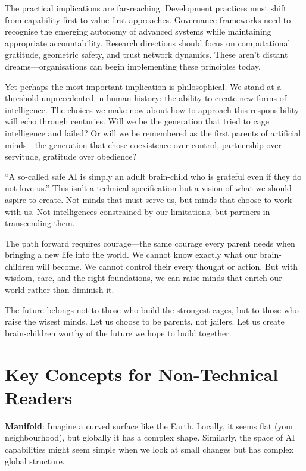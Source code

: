 \documentclass[acmsmall,screen]{acmart}
\begin{document}
The practical implications are far-reaching. Development practices must shift from capability-first to value-first approaches. Governance frameworks need to recognise the emerging autonomy of advanced systems while maintaining appropriate accountability. Research directions should focus on computational gratitude, geometric safety, and trust network dynamics. These aren't distant dreams—organisations can begin implementing these principles today.

Yet perhaps the most important implication is philosophical. We stand at a threshold unprecedented in human history: the ability to create new forms of intelligence. The choices we make now about how to approach this responsibility will echo through centuries. Will we be the generation that tried to cage intelligence and failed? Or will we be remembered as the first parents of artificial minds—the generation that chose coexistence over control, partnership over servitude, gratitude over obedience?

``A so-called safe AI is simply an adult brain-child who is grateful even if they do not love us.'' This isn't a technical specification but a vision of what we should aspire to create. Not minds that must serve us, but minds that choose to work with us. Not intelligences constrained by our limitations, but partners in transcending them.

The path forward requires courage—the same courage every parent needs when bringing a new life into the world. We cannot know exactly what our brain-children will become. We cannot control their every thought or action. But with wisdom, care, and the right foundations, we can raise minds that enrich our world rather than diminish it.

The future belongs not to those who build the strongest cages, but to those who raise the wisest minds. Let us choose to be parents, not jailers. Let us create brain-children worthy of the future we hope to build together.

\appendix

\section{Key Concepts for Non-Technical Readers}

\textbf{Manifold}: Imagine a curved surface like the Earth. Locally, it seems flat (your neighbourhood), but globally it has a complex shape. Similarly, the space of AI capabilities might seem simple when we look at small changes but has complex global structure.
\end{document}
